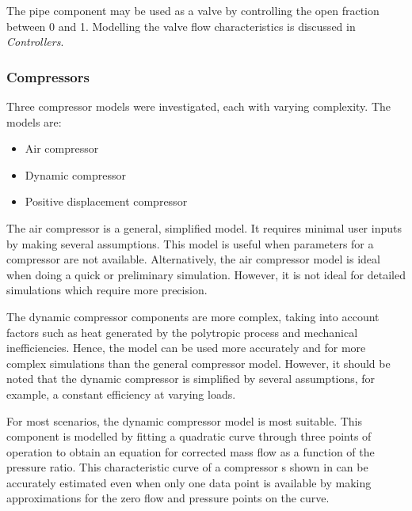 		The pipe component may be used as a valve by controlling the open fraction between 0 and 1. Modelling the valve flow characteristics is discussed in  \textit{Controllers}.
		
		\subsubsection{Compressors}
		Three compressor models were investigated, each with varying complexity. The models are:
		\begin{itemize}
			\item Air compressor
			\item Dynamic compressor 
			\item Positive displacement compressor
		\end{itemize} 
		The air compressor is a general, simplified model. It requires minimal user inputs by making several assumptions. This model is useful when parameters for a compressor are not available. Alternatively, the air compressor model is ideal when doing a quick or preliminary simulation. However, it is not ideal for detailed simulations which require more precision.
		\par 
		The dynamic compressor components are more complex, taking into account factors such as heat generated by the polytropic process and mechanical inefficiencies. Hence, the model can be used more accurately and for more complex simulations than the general compressor model. However, it should be noted that the dynamic compressor is simplified by several assumptions, for example, a constant efficiency at varying loads. 
		\par 	 
		For most scenarios, the dynamic compressor model is most suitable. This component is modelled by fitting a quadratic curve through three points of operation to obtain an equation for corrected mass flow as a function of the pressure ratio. This characteristic curve of a compressor s shown in  can be accurately estimated even when only one data point is available by making approximations for the zero flow and pressure points on the curve.
		\par
		
